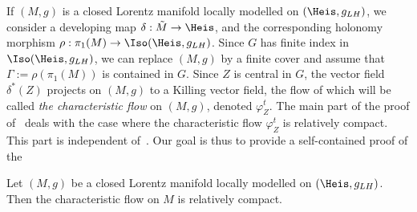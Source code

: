 If $(M,g)$ is a closed Lorentz manifold locally modelled on $(\Heis, g_{LH})$, we consider a developing map $\delta: \tilde{M} \to \Heis$, and the corresponding holonomy morphism $\rho: \pi_1(M) \to \Iso(\Heis, g_{LH})$. Since $G$ has finite index in $\Iso(\Heis, g_{LH})$, we can replace $(M,g)$ by a finite cover and assume that $\Gamma:=\rho(\pi_1(M))$ is contained in $G$. Since $Z$ is central in $G$, the vector field $\delta^*(Z)$ projects on $(M,g)$ to a Killing vector field, the flow of which will be called \emph{the characteristic flow} on $(M,g)$, denoted ${\varphi}_Z^t$. The main part of the proof of~\cite[Proposition~8.1]{sorin.ghani} deals with the case where the characteristic flow ${\varphi}_Z^t$ is relatively compact. This part is independent of~\cite{zeghibflot}. Our goal is thus to provide a self-contained proof of the



\begin{prop}\label{prop.complete2}
Let $(M,g)$ be a closed Lorentz manifold locally modelled on $(\Heis,g_{LH})$. Then the characteristic flow on $M$ is relatively compact.
\end{prop}

